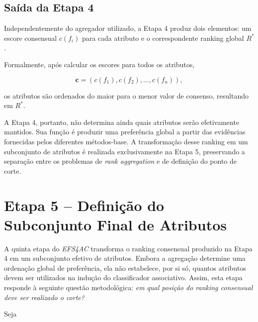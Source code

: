 \subsection{Saída da Etapa 4}
\label{subsec:ac-efs-saida-etapa4}

Independentemente do agregador utilizado, a Etapa 4 produz dois elementos:
um escore consensual $c(f_i)$ para cada atributo e o correspondente ranking
global $R^{*}$.

Formalmente, após calcular os escores para todos os atributos,

\begin{equation}
    \mathbf{c}
    =
    \left(
        c(f_1),c(f_2),\ldots,c(f_n)
    \right),
\end{equation}

os atributos são ordenados do maior para o menor valor de consenso, resultando
em $R^{*}$.

A Etapa 4, portanto, não determina ainda quais atributos serão efetivamente
mantidos. Sua função é produzir uma preferência global a partir das evidências
fornecidas pelos diferentes métodos-base. A transformação desse ranking em um
subconjunto de atributos é realizada exclusivamente na Etapa 5, preservando a
separação entre os problemas de \textit{rank aggregation} e de definição do
ponto de corte.

\section{Etapa 5 -- Definição do Subconjunto Final de Atributos}
\label{sec:ac-efs-etapa5}

A quinta etapa do \textit{EFS4AC} transforma o ranking consensual produzido na
Etapa 4 em um subconjunto efetivo de atributos. Embora a agregação determine
uma ordenação global de preferência, ela não estabelece, por si só, quantos
atributos devem ser utilizados na indução do classificador associativo. Assim,
esta etapa responde à seguinte questão metodológica: \textit{em qual posição do
ranking consensual deve ser realizado o corte?}

Seja

